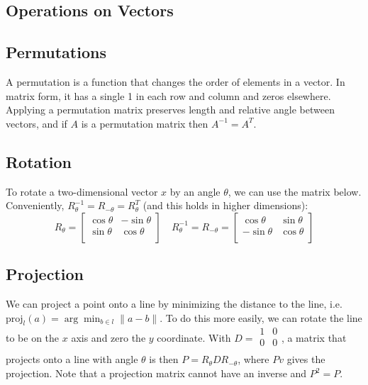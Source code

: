 \documentclass[10pt]{extarticle}
\begin{document}
\begin{multicols*}{2}
\section{Operations on Vectors}
\subsection{Permutations}
A permutation is a function that changes the order of elements in a vector. In matrix form, it has a single 1 in each row and column and zeros elsewhere.
Applying a permutation matrix preserves length and relative angle between vectors, and if $A$ is a permutation matrix then $A^{-1} = A^T$.

\subsection{Rotation}
To rotate a two-dimensional vector $x$ by an angle $\theta$, we can use the matrix below. Conveniently, $R_\theta^{-1} = R_{-\theta} = R_\theta^T$ (and this holds in higher dimensions):
\begin{equation*}
	R_\theta = 
	\begin{bmatrix}
		\cos \theta & -\sin \theta \\
		\sin \theta & \cos \theta \\
	\end{bmatrix}
	\quad
	R_\theta^{-1} = R_{-\theta} =
	\begin{bmatrix}
		\cos \theta & \sin \theta \\
		-\sin \theta & \cos \theta \\
	\end{bmatrix}
\end{equation*}

\subsection{Projection}
We can project a point onto a line by minimizing the distance to the line, i.e. $\text{proj}_l(a) = \arg\min_{b \in l} \| a - b \|$. To do this more easily, we can rotate the line to be on the $x$ axis and zero the $y$ coordinate. With $D = \begin{smallmatrix} 1 & 0 \\ 0 & 0 \\ \end{smallmatrix}$, a matrix that projects onto a line with angle $\theta$ is then $P = R_\theta D R_{-\theta}$, where $Pv$ gives the projection. Note that a projection matrix cannot have an inverse and $P^2 = P$.


\end{multicols*}
\end{document}
